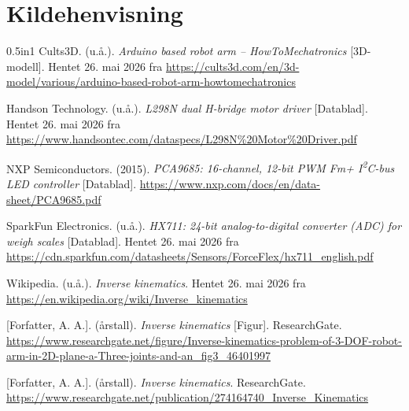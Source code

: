 \section{Kildehenvisning}
\begin{hangparas}{0.5in}{1}
Cults3D. (u.å.). \emph{Arduino based robot arm – HowToMechatronics} [3D-modell]. Hentet 26. mai 2026 fra \url{https://cults3d.com/en/3d-model/various/arduino-based-robot-arm-howtomechatronics}

Handson Technology. (u.å.). \emph{L298N dual H-bridge motor driver} [Datablad]. Hentet 26. mai 2026 fra \url{https://www.handsontec.com/dataspecs/L298N\%20Motor\%20Driver.pdf}

NXP Semiconductors. (2015). \emph{PCA9685: 16-channel, 12-bit PWM Fm+ I\textsuperscript{2}C-bus LED controller} [Datablad]. \url{https://www.nxp.com/docs/en/data-sheet/PCA9685.pdf}

SparkFun Electronics. (u.å.). \emph{HX711: 24-bit analog-to-digital converter (ADC) for weigh scales} [Datablad]. Hentet 26. mai 2026 fra \url{https://cdn.sparkfun.com/datasheets/Sensors/ForceFlex/hx711_english.pdf}

Wikipedia. (u.å.). \emph{Inverse kinematics}. Hentet 26. mai 2026 fra \url{https://en.wikipedia.org/wiki/Inverse_kinematics}

[Forfatter, A. A.]. (årstall). \emph{Inverse kinematics} [Figur]. ResearchGate. \url{https://www.researchgate.net/figure/Inverse-kinematics-problem-of-3-DOF-robot-arm-in-2D-plane-a-Three-joints-and-an_fig3_46401997}

[Forfatter, A. A.]. (årstall). \emph{Inverse kinematics}. ResearchGate. \url{https://www.researchgate.net/publication/274164740_Inverse_Kinematics}
\end{hangparas}